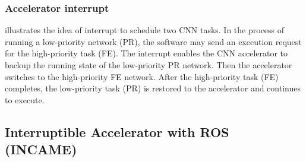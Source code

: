 



\subsubsection{Accelerator interrupt}  illustrates the idea of interrupt to schedule two CNN tasks. In the process of running a low-priority network (PR), the software may send an execution request for the high-priority task (FE). The interrupt enables the CNN accelerator to backup the running state of the low-priority PR network. Then the accelerator switches to the high-priority FE network. After the high-priority task (FE) completes, the low-priority task (PR) is restored to the accelerator and continues to execute.





\subsection{ Interruptible Accelerator with ROS (INCAME) }

